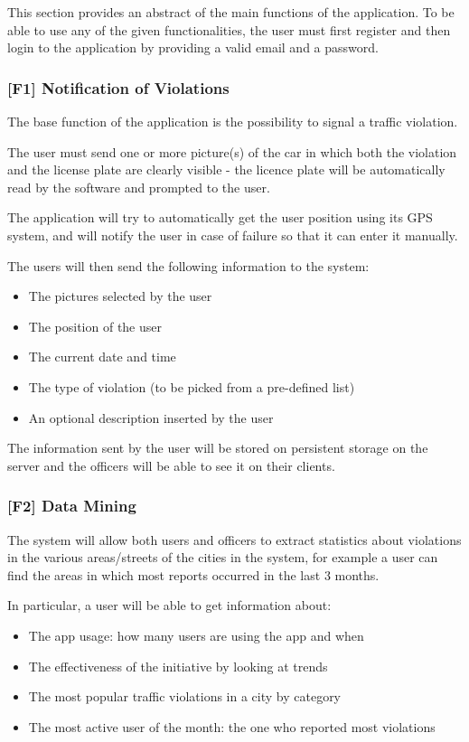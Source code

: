 This section provides an abstract of the main functions of the application. To be able to use any of the given functionalities, the user must first register and then login to the application by providing a valid email and a password.
\subsubsection[Notification of Violations]{[F1] Notification of Violations\hypertarget{sec:f1}{}}
\label{sec:notification_of_violations}
The base function of the application is the possibility to signal a traffic violation.

The user must send one or more picture(s) of the car in which both the violation and the license plate are clearly visible -
the licence plate will be automatically read by the software and prompted to the user.

The application will try to automatically get the user position using its GPS system, and will notify the user in case of failure so that it can enter it manually.

The users will then send the following information to the system:
\begin{itemize}
    \item The pictures selected by the user
    \item The position of the user
    \item The current date and time
    \item The type of violation (to be picked from a pre-defined list)
    \item An optional description inserted by the user
\end{itemize}
The information sent by the user will be stored on persistent storage on the server and the officers will be able to see it on their clients.

\clearpage
\subsubsection[Data Mining]{[F2] Data Mining\hypertarget{sec:f2}{}}
The system will allow both users and officers to extract statistics about violations in the various areas/streets of the cities in the system,
for example a user can find the areas in which most reports occurred in the last 3 months.

In particular, a user will be able to get information about:
\begin{itemize}
    \item The app usage: how many users are using the app and when
    \item The effectiveness of the initiative by looking at trends
    \item The most popular traffic violations in a city by category
    \item The most active user of the month: the one who reported most violations
\end{itemize}
